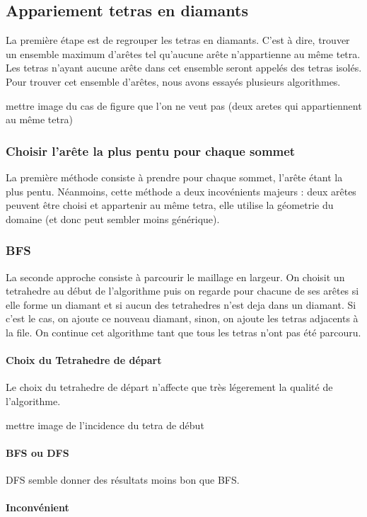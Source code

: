 \documentclass[a4paper,11pt,openany]{article}
\begin{document}
\subsection{Appariement tetras en diamants}
La première étape est de regrouper les tetras en diamants. C'est à dire, trouver un ensemble maximum d'arêtes tel qu'aucune arête n'appartienne au même tetra.
Les tetras n'ayant aucune arête dans cet ensemble seront appelés des tetras isolés.
Pour trouver cet ensemble d'arêtes, nous avons essayés plusieurs algorithmes.

mettre image du cas de figure que l'on ne veut pas (deux aretes qui appartiennent au même tetra)

\subsubsection{Choisir l'arête la plus pentu pour chaque sommet}
La première méthode consiste à prendre pour chaque sommet, l'arête étant la plus pentu. Néanmoins, cette méthode a deux incovénients majeurs : deux arêtes peuvent être choisi et appartenir au même tetra, elle utilise la géometrie du domaine (et donc peut sembler moins générique).

\subsubsection{BFS}
La seconde approche consiste à parcourir le maillage en largeur. On choisit un tetrahedre au début de l'algorithme puis on regarde pour chacune de ses arêtes si elle forme un diamant et si aucun des tetrahedres n'est deja dans un diamant. Si c'est le cas, on ajoute ce nouveau diamant, sinon, on ajoute les tetras adjacents à la file.
On continue cet algorithme tant que tous les tetras n'ont pas été parcouru.

\paragraph{Choix du Tetrahedre de départ}
Le choix du tetrahedre de départ n'affecte que très légerement la qualité de l'algorithme.

mettre image de l'incidence du tetra de début

\paragraph{BFS ou DFS}
DFS semble donner des résultats moins bon que BFS.

\paragraph{Inconvénient}
\end{document}
